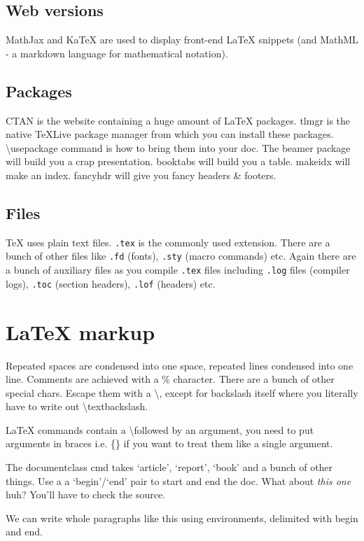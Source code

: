 \documentclass{article}
\begin{document}
\subsection{Web versions}
MathJax and KaTeX are used to display front-end LaTeX snippets (and MathML - a markdown language for mathematical notation).

\subsection{Packages}
CTAN is the website containing a huge amount of LaTeX packages. tlmgr is the native TeXLive package manager from which you can install these packages. \textbackslash usepackage command is how to bring them into your doc. The beamer package will build you a crap presentation. booktabs will build you a table. makeidx will make an index. fancyhdr will give you fancy headers \& footers.

\subsection{Files}
TeX uses plain text files. \texttt{.tex} is the commonly used extension. There are a bunch of other files like \texttt{.fd} (fonts), \texttt{.sty} (macro commands) etc. Again there are a bunch of auxiliary files as you compile \texttt{.tex} files including \texttt{.log} files (compiler logs), \texttt{.toc} (section headers), \texttt{.lof} (headers) etc.

\section{LaTeX markup}
Repeated spaces are condensed into one space, repeated lines condensed into one line. Comments are achieved with a \% character. There are a bunch of other special chars. Escape them with a \textbackslash, except for backslash itself where you literally have to write out \textbackslash textbackslash.

LaTeX commands contain a \textbackslash followed by an argument, you need to put arguments in braces i.e. \{\} if you want to treat them like a single argument.

The documentclass cmd takes `article', `report', `book' and a bunch of other things. Use a a `begin'/`end' pair to start and end the doc. What about \emph{this one} huh? You'll have to check the source.

\begin{em}
We can write whole paragraphs like this using environments, delimited with begin and end.
\end{em}
\end{document}

